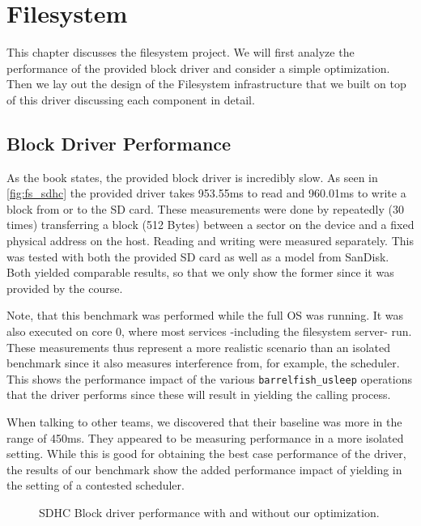 \chapter{Filesystem}

This chapter discusses the filesystem project.
We will first analyze the performance of the provided block driver and consider
a simple optimization.
Then we lay out the design of the Filesystem infrastructure that we built on top
of this driver discussing each component in detail.

\section{Block Driver Performance}

As the book states, the provided block driver is incredibly slow.
As seen in \autoref{fig:fs_sdhc} the provided driver takes 953.55ms to read and
960.01ms to write a block from or to the SD card.
These measurements were done by repeatedly (30 times) transferring a block (512 Bytes) between a sector on the device and a fixed physical address on the host.
Reading and writing were measured separately.
This was tested with both the provided SD card as well as a model from SanDisk.
Both yielded comparable results, so that we only show the former since it was provided by the course.

Note, that this benchmark was performed while the full OS was running.
It was also executed on core 0, where most services -including the filesystem server- run.
These measurements thus represent a more realistic scenario than an isolated 
benchmark since it also measures interference from, for example, the scheduler.
This shows the performance impact of the various \texttt{barrelfish_usleep}
operations that the driver performs since these will result in yielding the
calling process.

When talking to other teams, we discovered that their baseline was more in the
range of 450ms. They appeared to be measuring performance in a more isolated setting.
While this is good for obtaining the best case performance of the driver, 
the results of our benchmark show the added performance impact of yielding in
the setting of a contested scheduler.

\begin{figure}[ht]
    \centering
    \scalebox{0.6}{ }
    \caption{SDHC Block driver performance with and without our optimization.}
    \label{fig:fs_sdhc}
\end{figure}

